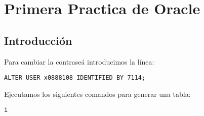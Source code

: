 \chapter{Primera Practica de Oracle}

\section{Introducción}

Para cambiar la contraseá introducimos la línea: 

\texttt{ALTER USER x0888108 IDENTIFIED BY 7114;}

Ejecutamos los siguientes comandos para generar una tabla:


\begin{lstlisting}[caption={Ejemplo de uso de DESCRIBE en SQL}]
    i
\end{lstlisting}



